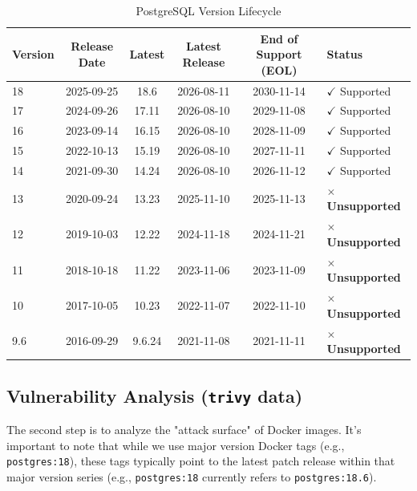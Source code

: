 \documentclass[11pt, a4paper]{article}
\begin{document}
\begin{table}[htbp]
\centering
\caption{PostgreSQL Version Lifecycle}
\label{tab:geol}
\begin{tabular}{@{}lccccl@{}}
	
	\textbf{Version} & \textbf{Release Date} & \textbf{Latest} & \textbf{Latest Release} & \textbf{End of Support (EOL)} & \textbf{Status} \\ \midrule
\rowcolor{lightgreen} 18 & 2025-09-25 & 18.6 & 2026-08-11 & 2030-11-14 & $\checkmark$ Supported \\
\rowcolor{lightgreen} 17 & 2024-09-26 & 17.11 & 2026-08-10 & 2029-11-08 & $\checkmark$ Supported \\
\rowcolor{lightgreen} 16 & 2023-09-14 & 16.15 & 2026-08-10 & 2028-11-09 & $\checkmark$ Supported \\
\rowcolor{lightgreen} 15 & 2022-10-13 & 15.19 & 2026-08-10 & 2027-11-11 & $\checkmark$ Supported \\
\rowcolor{lightgreen} 14 & 2021-09-30 & 14.24 & 2026-08-10 & 2026-11-12 & $\checkmark$ Supported \\
\rowcolor{lightred} 13 & 2020-09-24 & 13.23 & 2025-11-10 & 2025-11-13 & $\times$ \textbf{Unsupported} \\ \midrule
\rowcolor{lightred} 12 & 2019-10-03 & 12.22 & 2024-11-18 & 2024-11-21 & $\times$ \textbf{Unsupported} \\
\rowcolor{lightred} 11 & 2018-10-18 & 11.22 & 2023-11-06 & 2023-11-09 & $\times$ \textbf{Unsupported} \\
\rowcolor{lightred} 10 & 2017-10-05 & 10.23 & 2022-11-07 & 2022-11-10 & $\times$ \textbf{Unsupported} \\
\rowcolor{lightred} 9.6 & 2016-09-29 & 9.6.24 & 2021-11-08 & 2021-11-11 & $\times$ \textbf{Unsupported} \\ \bottomrule
\end{tabular}
\end{table}


\subsection{Vulnerability Analysis (\texttt{trivy} data)}

The second step is to analyze the "attack surface" of Docker images. It's important to note that while we use major version Docker tags (e.g., \texttt{postgres:18}), these tags typically point to the latest patch release within that major version series (e.g., \texttt{postgres:18} currently refers to \texttt{postgres:18.6}).
\end{document}
